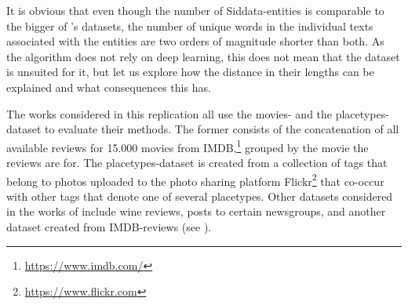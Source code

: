 \begin{table}[h]
	\centering
	\label{tab:summed_unique_words}
\end{table}

It is obvious that even though the number of Siddata-entities is comparable to the bigger of \cite{Derrac2015}'s datasets, the number of unique words in the individual texts associated with the entities are two orders of magnitude shorter than both. As the algorithm does not rely on deep learning, this does not mean that the dataset is unsuited for it, but let us explore how the distance in their lengths can be explained and what consequences this has.

The works considered in this replication \mainalgos all use the movies- and the  placetypes-dataset to evaluate their methods. The former consists of the concatenation of all available reviews for 15.000 movies from IMDB,\footnote{\url{https://www.imdb.com/}} grouped by the movie the reviews are for. The placetypes-dataset is created from a collection of tags that belong to photos uploaded to the photo sharing platform Flickr\footnote{\url{https://www.flickr.com}} that co-occur with other tags that denote one of several placetypes. Other datasets considered in the works of \mainalgos include wine reviews, posts to certain newsgroups, and another dataset created from IMDB-reviews (see ). 

